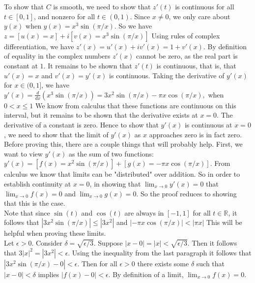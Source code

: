 \documentclass{article}
\theoremstyle{definition}
\newcommand{\R}{\mathbb{R}}
\newcommand{\cs}[1]{\color{blue}{#1}\normalcolor}
\begin{document}
 To show that $C$ is smooth, we need to show that $z'(t)$ is continuous for all $t\in[0,1]$, and nonzero for all $t\in (0,1)$. Since $x\ne 0$, we only care about $y(x)$ when $y(x) = x^3\sin(\pi/x)$. So we have $z = [u(x) = x] + i[v(x) = x^3\sin(\pi/x)]$ Using rules of complex differentiation, we have $z'(x) = u'(x) + iv'(x) = 1 + v'(x)$. By definition of equality in the complex numbers $z'(x)$ cannot be zero, as the real part is constant at $1$. It remains to be shown that $z'(t)$ is continuous, that is, that $u'(x) = x$ and $v'(x) = y'(x)$ is continuous. Taking the derivative of $y'(x)$ for $x\in (0,1]$, we have $y'(x) = \frac{d}{dx}(x^3\sin(\pi/x)) = 3x^2\sin(\pi/x) -\pi x\cos(\pi/x),$ when $0<x\le 1$ We know from calculus that these functions are continuous on this interval, but it remains to be shown that the derivative exists at $x = 0$. The derivative of a constant is zero. \cs{That's a little misleading here. If a function is constant *on an interval*, its derivative is 0. You need to apply the definition of the derivative at $x=0.$} Hence to show that $y'(x)$ is continuous at $x = 0$, we need to show that the limit of $y'(x)$ as $x$ approaches zero is in fact zero. \\

Before proving this, there are a couple things that will probably help. First, we want to view $y'(x)$ as the sum of two functions: $y'(x) = [f(x) = x^2\sin(\pi/x)] + [g(x) = -\pi x\cos(\pi/x)]$. From calculus we know that limits can be "distributed" over addition. So in order to establish continuity at $x= 0$, in showing that $\lim_{x\rightarrow 0}y'(x) = 0$ that $\lim_{x\rightarrow 0}f(x) = 0$ and $\lim_{x\rightarrow 0}g(x) = 0$. So the proof reduces to showing that this is the case.\\

Note that since $\sin(t)$ and $\cos(t)$ are always in $[-1,1]$ for all $t\in \R$, it follows that $|3x^2\sin(\pi/x)|\le |3x^2|$ and $|-\pi x\cos(\pi/x)| <|\pi x|$ This will be helpful when proving these limits.\\

Let $\epsilon > 0$. Consider $\delta = \sqrt{\epsilon/3}$. Suppose $|x - 0| = |x| < \sqrt{\epsilon/3}$. Then it follows that $3|x|^2 = |3x^2| < \epsilon$. Using the inequality from the last paragraph it follows that $|3x^2\sin(\pi/x) - 0| < \epsilon$. Then for all $\epsilon>0$ there exists some $\delta$ such that $|x-0| <\delta$ implies $|f(x) - 0| < \epsilon$. By definition of a limit, $\lim_{x\rightarrow 0}f(x) = 0$. \cs{Or use the Squeeze Theorem.}\\
\end{document}
